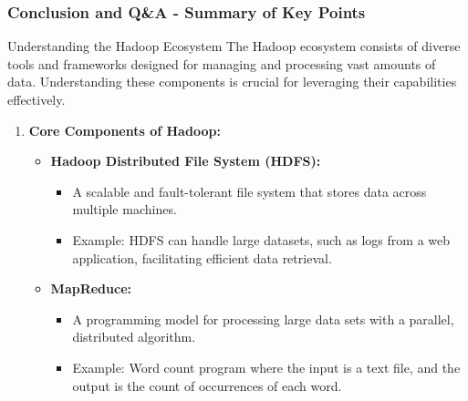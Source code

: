 \documentclass[aspectratio=169]{beamer}
\begin{document}
\begin{frame}[fragile]
    \frametitle{Conclusion and Q\&A - Summary of Key Points}
    \begin{block}{Understanding the Hadoop Ecosystem}
        The Hadoop ecosystem consists of diverse tools and frameworks designed for managing and processing vast amounts of data. Understanding these components is crucial for leveraging their capabilities effectively.
    \end{block}

    \begin{enumerate}
        \item \textbf{Core Components of Hadoop:}
        \begin{itemize}
            \item \textbf{Hadoop Distributed File System (HDFS):}
            \begin{itemize}
                \item A scalable and fault-tolerant file system that stores data across multiple machines.
                \item Example: HDFS can handle large datasets, such as logs from a web application, facilitating efficient data retrieval.
            \end{itemize}

            \item \textbf{MapReduce:}
            \begin{itemize}
                \item A programming model for processing large data sets with a parallel, distributed algorithm.
                \item Example: Word count program where the input is a text file, and the output is the count of occurrences of each word.
            \end{itemize}
        \end{itemize}
    \end{enumerate}
\end{frame}
\end{document}
